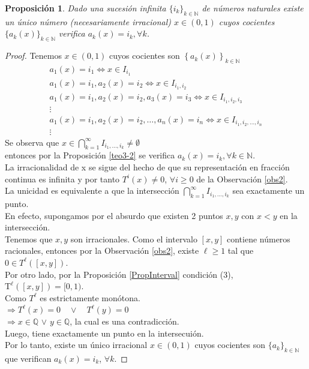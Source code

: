 \documentclass[12pt]{report}
\newtheorem{prop}{Proposición}[section]
\begin{document}
\begin{prop}
Dado una sucesión infinita $\{i_{k}\}_{k\in\mathbb{N}}$ de números naturales existe un único número (necesariamente irracional) $x \in(0,1)$ cuyos cocientes $\{ a_{k}(x)\}_{k\in\mathbb{N}}$ verifica $a_{k}(x)=i_{k}, \forall k$.
\label{teo3-3}
\end{prop}
\begin{proof}
Tenemos $x \in(0,1)$ cuyos cocientes son $\left\{a_{k}(x)\right\}_{k\in\mathbb{N}}$
\begin{equation*}
    \begin{array}{l}
    a_{1}(x)=i_{1} \Longleftrightarrow x \in I_{i_{1}}\\
    a_{1}(x)=i_{1}, a_{2}(x)=i_{2} \Longleftrightarrow x \in I_{i_{1}, i_{2}}\\
    a_{1}(x)=i_{1}, a_{2}(x)=i_{2}, a_{3}(x)=i_{3} \Longleftrightarrow x \in I_{i_{1}, i_{2}, i_{3}}
    \\
    \vdots
    \\
    a_{1}(x)=i_{1}, a_{2}(x)=i_{2}, \ldots, a_{n}(x)=i_{n} \Longleftrightarrow x \in I_{i_{1}, i_{2}, \ldots, i_{n}}
    \\
    \vdots
    \end{array}
    \end{equation*}
    Se observa que $x \in \displaystyle\bigcap_{k=1}^{\infty} I_{i_{1}, \ldots, i_{k}} \neq \emptyset$
    \\
    entonces por la Proposición \ref{teo3-2} se verifica $a_{k}(x)=i_{k}, \forall k \in \mathbb{N}$.
    \\
    La irracionalidad de x se sigue del hecho de que su representación en fracción continua es infinita y por tanto $T^{i}(x) \neq 0$,  $\forall i \geqslant 0$ de la Observación \ref{obs2}.
    \\
    La unicidad es equivalente a que la intersección $\displaystyle\bigcap_{k=1}^{\infty}I_{i_{1},\ldots,i_{k}}$ sea exactamente un punto.
    \\
    En efecto, supongamos por el absurdo que existen 2 puntos $x,y$ con $x<y$ en la intersección.
    \\
    Tenemos que $x, y$ son irracionales. Como el intervalo $[x, y]$ contiene números racionales, entonces por la Observación \ref{obs2}, existe $\ell\geq1$ tal que $0\in T^{\ell}([x,y])$.
    \\
    Por otro lado, por la Proposición \ref{PropInterval} condición (3), $\mathrm{T}^{\ell}([x, y])=[0,1)$.
    \\
    Como $T^{\ell}$ es estrictamente monótona.
    \\
    $\Rightarrow T^{\ell}(x)=0 \quad \vee \quad T^{\ell}(y)=0$
    \\
    $\Rightarrow x\in\mathbb{Q}$ $\vee$ $y\in\mathbb{Q}$, la cual es una contradicción.
    \\
    Luego, tiene exactamente un punto en la intersecuión.
    \\
    Por lo tanto, existe un único irracional $x\in(0,1)$ cuyos cocientes son $\{a_{k}\}_{k\in\mathbb{N}}$ que verifican $a_{k}(x)=i_{k}$, $\forall k$.
\end{proof}
\end{document}
